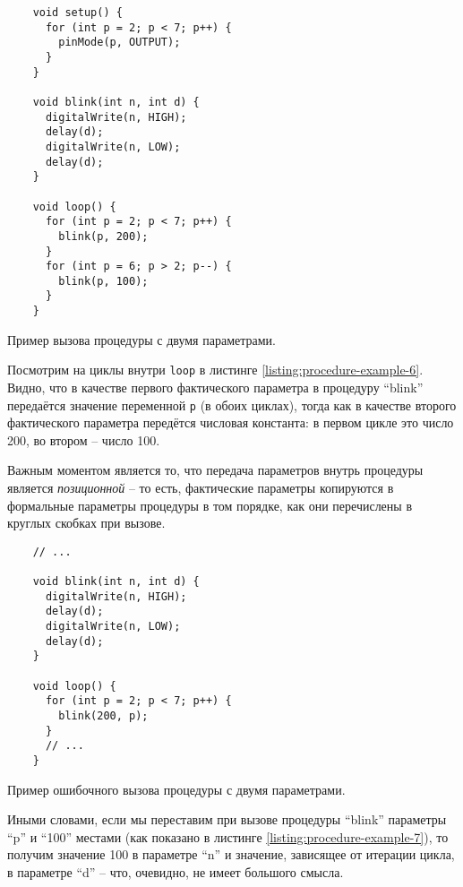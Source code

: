 \documentclass[../sparc.tex]{subfiles}
\begin{document}
\begin{listing}[H]
  \begin{verbatim}
    void setup() {
      for (int p = 2; p < 7; p++) {
        pinMode(p, OUTPUT);
      }
    }

    void blink(int n, int d) {
      digitalWrite(n, HIGH);
      delay(d);
      digitalWrite(n, LOW);
      delay(d);
    }

    void loop() {
      for (int p = 2; p < 7; p++) {
        blink(p, 200);
      }
      for (int p = 6; p > 2; p--) {
        blink(p, 100);
      }
    }
  \end{verbatim}
  \label{listing:procedure-example-6}
  \caption{Пример вызова процедуры с двумя параметрами.}
\end{listing}

Посмотрим на циклы внутри \texttt{loop} в листинге
\ref{listing:procedure-example-6}.  Видно, что в качестве первого фактического
параметра в процедуру ``blink'' передаётся значение переменной
\texttt{p} (в обоих циклах), тогда как в качестве второго фактического
параметра передётся числовая константа: в первом цикле это число 200, во втором
-- число 100.

Важным моментом является то, что передача параметров внутрь процедуры является
\emph{позиционной} -- то есть, фактические параметры копируются в формальные
параметры процедуры в том порядке, как они перечислены в круглых скобках при
вызове.

\begin{listing}[H]
  \begin{verbatim}
    // ...

    void blink(int n, int d) {
      digitalWrite(n, HIGH);
      delay(d);
      digitalWrite(n, LOW);
      delay(d);
    }

    void loop() {
      for (int p = 2; p < 7; p++) {
        blink(200, p);
      }
      // ...
    }
  \end{verbatim}
  \label{listing:procedure-example-7}
  \caption{Пример ошибочного вызова процедуры с двумя параметрами.}
\end{listing}

Иными словами, если мы переставим при вызове процедуры ``blink'' параметры ``p''
и ``100'' местами (как показано в листинге \ref{listing:procedure-example-7}),
то получим значение 100 в параметре ``n'' и значение, зависящее от итерации
цикла, в параметре ``d'' -- что, очевидно, не имеет большого смысла.
\end{document}
